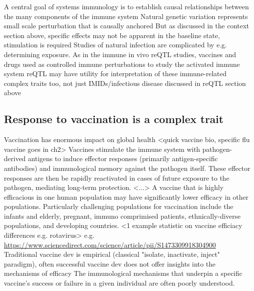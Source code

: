 \begin{outline}
\1 A central goal of systems immunology is to establish causal relationships between the many components of the immune system
    \2 Natural genetic variation represents small scale perturbation that is causally anchored \autocite{tsang2015UtilizingPopulationVariation,villani2018SystemsImmunologyLearning}
    \2 But as discussed in the context section above, specific effects may not be apparent in the baseline state, stimulation is required
    \2 Studies of natural infection are complicated by e.g. determining exposure.
    \2 As in the immune in vivo reQTL studies, vaccines and drugs used as controlled immune perturbations to study the activated immune system
        \3 reQTL may have utility for interpretation of these immune-related complex traits too, not just IMIDs/infectious disease discussed in reQTL section above

\subsection{Response to vaccination is a complex trait}

\1 Vaccination has enormous impact on global health \autocite{greenwood2014ContributionVaccinationGlobal}
    \2 <quick vaccine bio, specific flu vaccine goes in ch2>
        \3 Vaccines stimulate the immune system with pathogen-derived antigens to induce effector responses (primarily antigen-specific antibodies) and immunological memory against the pathogen itself.
        \3 These effector responses are then be rapidly reactivated in cases of future exposure to the pathogen, mediating long-term protection.
        \3 <...>
    \2 A vaccine that is highly efficacious in one human population may have significantly lower efficacy in other populations.
    Particularly challenging populations for vaccination include the infants and elderly, pregnant, immuno comprimised patients, ethnically-diverse populations, and developing countries.
        \3 <1 example statistic on vaccine efficiacy differences e.g. rotavirus>
        \3 e.g. \url{https://www.sciencedirect.com/science/article/pii/S1473309918304900}
    \2 Traditional vaccine dev is empirical (classical "isolate, inactivate, inject" paradigm), often successful vaccine dev does not offer insights into the mechanisms of efficacy 
    \2 The immunological mechanisms that underpin a specific vaccine's success or failure in a given individual are often poorly understood.


\end{outline}
